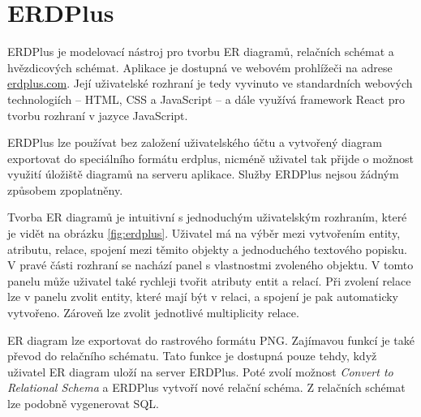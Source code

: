 \section{ERDPlus}

ERDPlus je modelovací nástroj pro tvorbu ER diagramů, relačních schémat a
hvězdicových schémat. Aplikace je dostupná ve webovém prohlížeči na adrese
\url{erdplus.com}. Její uživatelské rozhraní je tedy vyvinuto ve standardních
webových technologiích -- HTML, CSS a JavaScript -- a dále využívá framework
React pro tvorbu rozhraní v jazyce JavaScript.

ERDPlus lze používat bez založení uživatelského účtu a vytvořený diagram
exportovat do speciálního formátu erdplus, nicméně uživatel tak přijde o možnost
využití úložiště diagramů na serveru aplikace. Služby ERDPlus nejsou žádným
způsobem zpoplatněny.

Tvorba ER diagramů je intuitivní s jednoduchým uživatelským rozhraním, které je
vidět na obrázku \ref{fig:erdplus}. Uživatel má na výběr mezi vytvořením entity,
atributu, relace, spojení mezi těmito objekty a jednoduchého textového popisku.
V pravé části rozhraní se nachází panel s vlastnostmi zvoleného objektu. V tomto
panelu může uživatel také rychleji tvořit atributy entit a relací. Při zvolení
relace lze v panelu zvolit entity, které mají být v relaci, a spojení je pak
automaticky vytvořeno. Zároveň lze zvolit jednotlivé multiplicity relace.

ER diagram lze exportovat do rastrového formátu PNG. Zajímavou funkcí je také
převod do relačního schématu. Tato funkce je dostupná pouze tehdy, když uživatel
ER diagram uloží na server ERDPlus. Poté zvolí možnost \emph{Convert to
Relational Schema} a ERDPlus vytvoří nové relační schéma. Z relačních schémat
lze podobně vygenerovat SQL.

